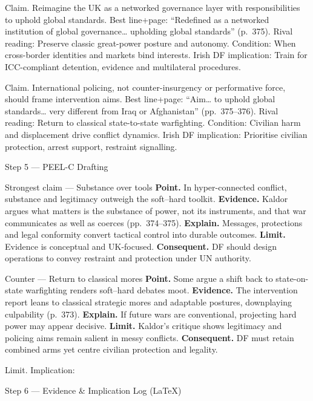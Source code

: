 Claim. Reimagine the UK as a networked governance layer with responsibilities to uphold global standards.
Best line+page: “Redefined as a networked institution of global governance… upholding global standards” (p.~375).
Rival reading: Preserve classic great-power posture and autonomy.
Condition: When cross-border identities and markets bind interests.
Irish DF implication: Train for ICC-compliant detention, evidence and multilateral procedures.

Claim. International policing, not counter-insurgency or performative force, should frame intervention aims.
Best line+page: “Aim… to uphold global standards… very different from Iraq or Afghanistan” (pp.~375–376).
Rival reading: Return to classical state-to-state warfighting.
Condition: Civilian harm and displacement drive conflict dynamics.
Irish DF implication: Prioritise civilian protection, arrest support, restraint signalling.

Step 5 — PEEL-C Drafting

Strongest claim — Substance over tools
\textbf{Point.} In hyper-connected conflict, substance and legitimacy outweigh the soft–hard toolkit.
\textbf{Evidence.} Kaldor argues what matters is the substance of power, not its instruments, and that war communicates as well as coerces (pp.~374–375).
\textbf{Explain.} Messages, protections and legal conformity convert tactical control into durable outcomes.
\textbf{Limit.} Evidence is conceptual and UK-focused.
\textbf{Consequent.} DF should design operations to convey restraint and protection under UN authority.

Counter — Return to classical mores
\textbf{Point.} Some argue a shift back to state-on-state warfighting renders soft–hard debates moot.
\textbf{Evidence.} The intervention report leans to classical strategic mores and adaptable postures, downplaying culpability (p.~373).
\textbf{Explain.} If future wars are conventional, projecting hard power may appear decisive.
\textbf{Limit.} Kaldor’s critique shows legitimacy and policing aims remain salient in messy conflicts.
\textbf{Consequent.} DF must retain combined arms yet centre civilian protection and legality.

Limit. Implication:

Step 6 — Evidence \& Implication Log (LaTeX)

